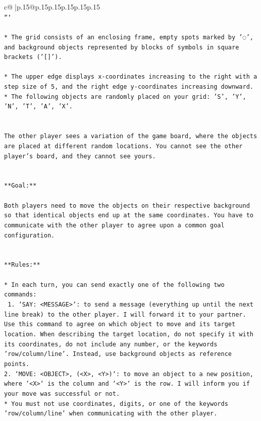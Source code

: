 \documentclass{article}
\begin{document}
{\begin{supertabular}{c@{$\;$}|p{.15\linewidth}@{}p{.15\linewidth}p{.15\linewidth}p{.15\linewidth}p{.15\linewidth}p{.15\linewidth}}
{{{\\ 
\texttt{```} \\
\\ 
\texttt{* The grid consists of an enclosing frame, empty spots marked by '◌', and background objects represented by blocks of symbols in square brackets ('{[}{]}').} \\
\\ 
\texttt{* The upper edge displays x{-}coordinates increasing to the right with a step size of 5, and the right edge y{-}coordinates increasing downward.} \\
\texttt{* The following objects are randomly placed on your grid: 'S', 'Y', 'N', 'T', 'A', 'X'.} \\
\\ 
\\ 
\texttt{The other player sees a variation of the game board, where the objects are placed at different random locations. You cannot see the other player's board, and they cannot see yours.} \\
\\ 
\\ 
\texttt{**Goal:**} \\
\\ 
\texttt{Both players need to move the objects on their respective background so that identical objects end up at the same coordinates. You have to communicate with the other player to agree upon a common goal configuration.} \\
\\ 
\\ 
\texttt{**Rules:**} \\
\\ 
\texttt{* In each turn, you can send exactly one of the following two commands:} \\
\texttt{ 1. `SAY: <MESSAGE>`: to send a message (everything up until the next line break) to the other player. I will forward it to your partner. Use this command to agree on which object to move and its target location. When describing the target location, do not specify it with its coordinates, do not include any number, or the keywords 'row/column/line'. Instead, use background objects as reference points.} \\
\texttt{2. `MOVE: <OBJECT>, (<X>, <Y>)`: to move an object to a new position, where `<X>` is the column and `<Y>` is the row. I will inform you if your move was successful or not.} \\
\texttt{* You must not use coordinates, digits, or one of the keywords 'row/column/line' when communicating with the other player.} \\
}}}
\end{supertabular}}
\end{document}
